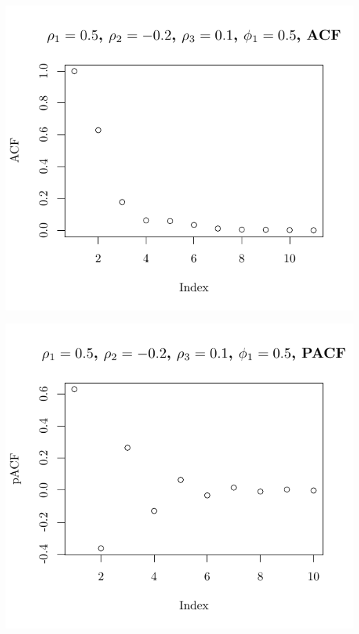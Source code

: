 \documentclass[10pt]{paper}\usepackage[]{graphicx}\usepackage[]{color}
\makeatletter
\def\maxwidth{ %
  \ifdim\Gin@nat@width>\linewidth
    \linewidth
  \else
    \Gin@nat@width
  \fi
}
\newenvironment{knitrout}{}{} %
\makeatother
\begin{document}
\begin{knitrout}
{\centering \includegraphics[width=\maxwidth]{figure/graphics-plotter-135} 

}




{\centering \includegraphics[width=\maxwidth]{figure/graphics-plotter-136} 

}





\end{knitrout}
\end{document}
